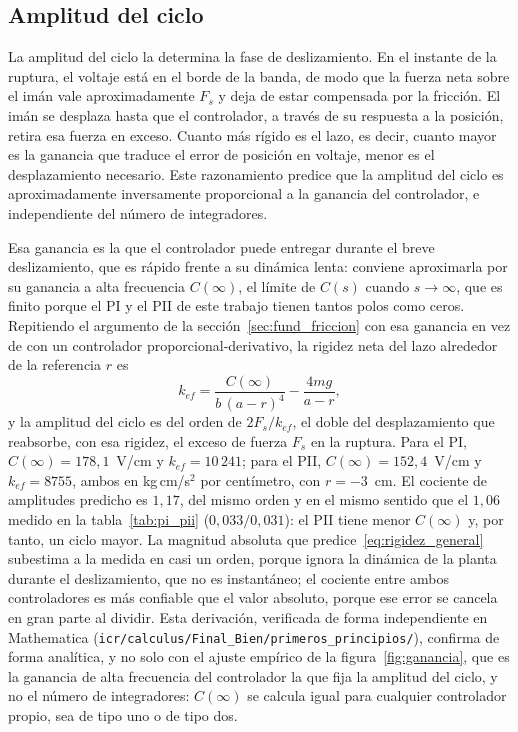 \subsection{Amplitud del ciclo}

La amplitud del ciclo la determina la fase de deslizamiento. En el instante de la ruptura, el voltaje está en el borde de la banda, de modo que la fuerza neta sobre el imán vale aproximadamente $F_s$ y deja de estar compensada por la fricción. El imán se desplaza hasta que el controlador, a través de su respuesta a la posición, retira esa fuerza en exceso. Cuanto más rígido es el lazo, es decir, cuanto mayor es la ganancia que traduce el error de posición en voltaje, menor es el desplazamiento necesario. Este razonamiento predice que la amplitud del ciclo es aproximadamente inversamente proporcional a la ganancia del controlador, e independiente del número de integradores.

Esa ganancia es la que el controlador puede entregar durante el breve deslizamiento, que es rápido frente a su dinámica lenta: conviene aproximarla por su ganancia a alta frecuencia $C(\infty)$, el límite de $C(s)$ cuando $s\to\infty$, que es finito porque el PI y el PII de este trabajo tienen tantos polos como ceros. Repitiendo el argumento de la sección~\ref{sec:fund_friccion} con esa ganancia en vez de con un controlador proporcional-derivativo, la rigidez neta del lazo alrededor de la referencia $r$ es
\begin{equation}
k_{ef} = \frac{C(\infty)}{b\,(a-r)^4} - \frac{4mg}{a-r} ,
\label{eq:rigidez_general}
\end{equation}
y la amplitud del ciclo es del orden de $2F_s/k_{ef}$, el doble del desplazamiento que reabsorbe, con esa rigidez, el exceso de fuerza $F_s$ en la ruptura. Para el PI, $C(\infty)=178{,}1$~V/cm y $k_{ef}=10\,241$; para el PII, $C(\infty)=152{,}4$~V/cm y $k_{ef}=8755$, ambos en kg\,cm/s$^2$ por centímetro, con $r=-3$~cm. El cociente de amplitudes predicho es $1{,}17$, del mismo orden y en el mismo sentido que el $1{,}06$ medido en la tabla~\ref{tab:pi_pii} ($0{,}033/0{,}031$): el PII tiene menor $C(\infty)$ y, por tanto, un ciclo mayor. La magnitud absoluta que predice~\eqref{eq:rigidez_general} subestima a la medida en casi un orden, porque ignora la dinámica de la planta durante el deslizamiento, que no es instantáneo; el cociente entre ambos controladores es más confiable que el valor absoluto, porque ese error se cancela en gran parte al dividir. Esta derivación, verificada de forma independiente en Mathematica (\texttt{icr/calculus/Final\_Bien/primeros\_principios/}), confirma de forma analítica, y no solo con el ajuste empírico de la figura~\ref{fig:ganancia}, que es la ganancia de alta frecuencia del controlador la que fija la amplitud del ciclo, y no el número de integradores: $C(\infty)$ se calcula igual para cualquier controlador propio, sea de tipo uno o de tipo dos.

